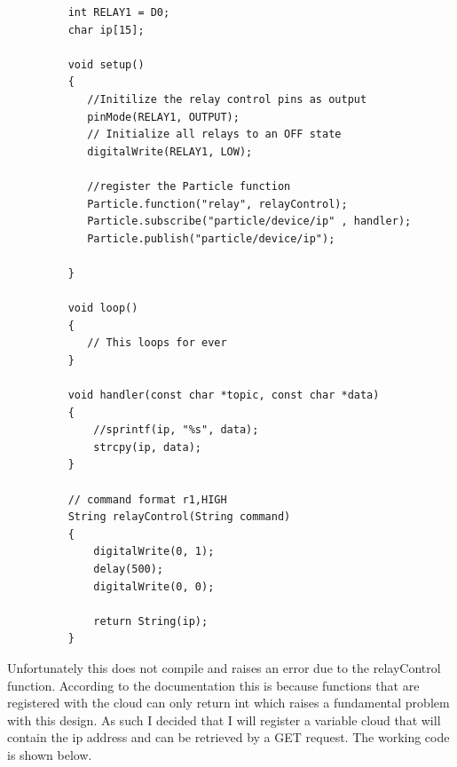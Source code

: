 \documentclass{article}
\begin{document}
\begin{figure}[H]
    \begin{lstlisting}
    int RELAY1 = D0;
    char ip[15];

    void setup()
    {
       //Initilize the relay control pins as output
       pinMode(RELAY1, OUTPUT);
       // Initialize all relays to an OFF state
       digitalWrite(RELAY1, LOW);

       //register the Particle function
       Particle.function("relay", relayControl);
       Particle.subscribe("particle/device/ip" , handler);
       Particle.publish("particle/device/ip");

    }

    void loop()
    {
       // This loops for ever
    }

    void handler(const char *topic, const char *data)
    {
        //sprintf(ip, "%s", data);
        strcpy(ip, data);
    }

    // command format r1,HIGH
    String relayControl(String command)
    {
        digitalWrite(0, 1);
        delay(500);
        digitalWrite(0, 0);

        return String(ip);
    }
    \end{lstlisting}
\end{figure}

Unfortunately this does not compile and raises an error due to the relayControl function.
According to the documentation this is because functions that are registered with the
cloud can only return int which raises a fundamental problem with this design. As such
I decided that I will register a variable cloud that will contain the ip address and can
be retrieved by a GET request. The working code is shown below.
\end{document}
